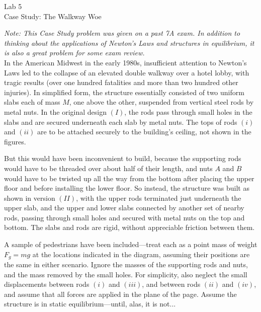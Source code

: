\documentclass[11pt]{article}
\theoremstyle{gangnamstyle}{\newtheorem{definition}{Definition}[]}
\theoremstyle{gangnamstyle}{\newtheorem{example}{Example}[]}
\theoremstyle{gangnamstyle}{\newtheorem{problem}{Problem}[]}
\begin{document}
\normalfont
\pagestyle{pages}


\begin{center}
\vspace{3in}
{\Large Lab 5 } \\ [0.05in]
Case Study: The Walkway Woe \\ [-0.5in]
\end{center}

\textit{Note: This Case Study problem was given on a past 7A exam. In addition to thinking about the applications of Newton's Laws and structures in equilibrium, it is also a great problem for some exam review.} \\

In the American Midwest in the early 1980s, insufficient attention to Newton’s Laws led to the collapse of an elevated double walkway over a hotel lobby, with tragic results (over one hundred fatalities and more than two hundred other injuries). In simplified form, the structure essentially consisted of two uniform slabs each of mass $M$, one above the other, suspended from vertical steel rods by metal nuts. In the original design $(I)$, the rods pass through small holes in the slabs and are secured underneath each slab by metal nuts. The tops of rods $(i)$ and $(ii)$ are to be attached securely to the building’s ceiling, not shown in the figures. 

But this would have been inconvenient to build, because the supporting rods would have to be threaded over about half of their length, and nuts $A$ and $B$ would have to be twisted up all the way from the bottom after placing the upper floor and before installing the lower floor. So instead, the structure was built as shown in version $(II)$, with the upper rods terminated just underneath the upper slab, and the upper and lower slabs connected by another set of nearby rods, passing through small holes and secured with metal nuts on the top and bottom. The slabs and rods are rigid, without appreciable friction between them. 

A sample of pedestrians have been included—treat each as a point mass of weight $F_g = mg$ at the locations indicated in the diagram, assuming their positions are the same in either scenario. Ignore the masses of the supporting rods and nuts, and the mass removed by the small holes. For simplicity, also neglect the small displacements between rods $(i)$ and $(iii)$, and between rods $(ii)$ and $(iv)$, and assume that all forces are applied in the plane of the page. Assume the structure is in static equilibrium---until, alas, it is not...
\end{document}
